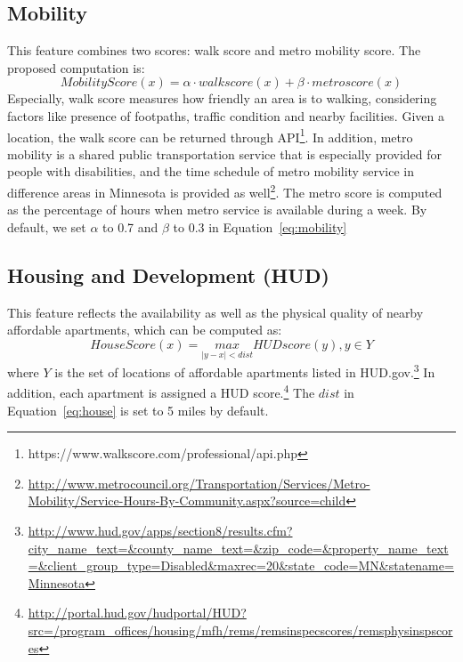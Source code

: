 \documentclass[10pt]{article}
\begin{document}
\subsection{Mobility}
This feature combines two scores: walk score and metro mobility score.  The proposed computation is:
\begin{equation}
MobilityScore(x) = \alpha \cdot walkscore(x) + \beta \cdot metroscore(x)
\label{eq:mobility}
\end{equation}
Especially, walk score measures how friendly an area is to walking, considering factors like presence of footpaths, traffic condition and nearby facilities. Given a location, the walk score can be returned through API\footnote{https://www.walkscore.com/professional/api.php}. In addition, metro mobility is a shared public transportation service that is especially provided for people with disabilities, and the time schedule of metro mobility service in difference areas in Minnesota is provided as well\footnote{\url{http://www.metrocouncil.org/Transportation/Services/Metro-Mobility/Service-Hours-By-Community.aspx?source=child}}. The metro score 
is computed as the percentage of hours when metro service is available during a week. By default, we set $\alpha$ to 0.7 and $\beta$ to 0.3 in Equation~\ref{eq:mobility}

\subsection{Housing and Development (HUD)}
This feature reflects the availability as well as the physical quality of nearby affordable apartments, which can be computed as:
\begin{equation}
HouseScore(x) = \underset{|y-x|<dist}{max}HUDscore(y), y\in Y
\label{eq:house}
\end{equation}
where $Y$ is the set of locations of affordable apartments listed in HUD.gov.\footnote{\url{http://www.hud.gov/apps/section8/results.cfm?city_name_text=&county_name_text=&zip_code=&property_name_text=&client_group_type=Disabled&maxrec=20&state_code=MN&statename=Minnesota}} In addition, each apartment is assigned a HUD score.\footnote{\url{http://portal.hud.gov/hudportal/HUD?src=/program_offices/housing/mfh/rems/remsinspecscores/remsphysinspscores}} The $dist$ in Equation~\ref{eq:house} is set to 5 miles by default.
\end{document}
